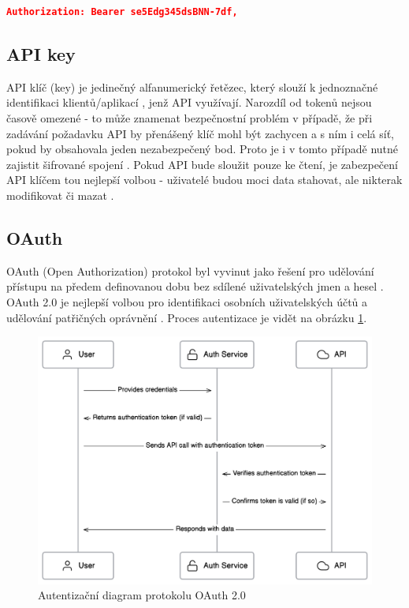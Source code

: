 \documentclass[czech, bc, kiv, he, iso690numb]{fasthesis}
\begin{document}
\begin{lstlisting}[language=json, caption={Autorizační atribut - Bearer schéma}, label=bearerHeader]
	Authorization: Bearer se5Edg345dsBNN-7df,
\end{lstlisting}


\subsection{API key}
API klíč (key) je jedinečný alfanumerický řetězec, který slouží k jednoznačné identifikaci klientů/aplikací \cite{amazonAPIKey}, jenž API využívají. Narozdíl od tokenů
nejsou časově omezené - to může znamenat bezpečnostní problém v případě, že při zadávání požadavku API by přenášený klíč mohl být zachycen \cite{mostUsedAuthentication} a s ním i celá síť, pokud by obsahovala jeden nezabezpečený bod. Proto je i v tomto případě nutné zajistit šifrované spojení \cite{keepingApiKeysSafe}.
Pokud API bude sloužit pouze ke čtení, je zabezpečení API klíčem tou nejlepší volbou - uživatelé budou moci data stahovat, ale nikterak modifikovat či mazat \cite{mostUsedAuthentication}. 

\subsection{OAuth}
OAuth (Open Authorization) protokol byl vyvinut jako řešení pro udělování přístupu na předem definovanou dobu bez sdílené uživatelských jmen a hesel \cite{understandingOAuth2}. OAuth 2.0
je nejlepší volbou pro identifikaci osobních uživatelských účtů a udělování patřičných oprávnění \cite{mostUsedAuthentication}. Proces autentizace je vidět na obrázku \ref{fig:oauth2Diagram}.


\begin{figure}
	\centering
	\includegraphics[width=1\textwidth]{pictures/oauth2-diagram.png}
	\caption{Autentizační diagram protokolu OAuth 2.0 \cite{oAuthImage}}
	\label{fig:oauth2Diagram}
\end{figure}
\end{document}
